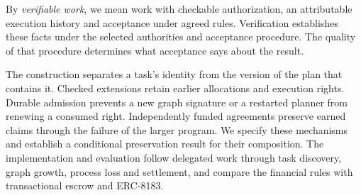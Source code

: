 By \emph{verifiable work}, we mean work with checkable authorization, an
attributable execution history and acceptance under agreed rules. Verification
establishes these facts under the selected authorities and acceptance procedure.
The quality of that procedure determines what acceptance says about the result.

The construction separates a task's identity from the version of the plan that
contains it. Checked extensions retain earlier allocations and execution rights.
Durable admission prevents a new graph signature or a restarted planner from
renewing a consumed right. Independently funded agreements preserve earned
claims through the failure of the larger program. We specify these mechanisms
and establish a conditional preservation result for their composition. The
implementation and evaluation follow delegated work through task discovery,
graph growth, process loss and settlement, and compare the financial rules with
transactional escrow and ERC-8183.
